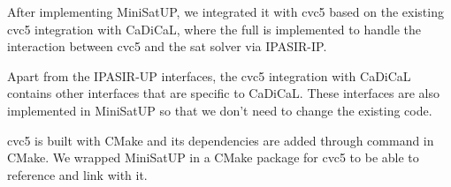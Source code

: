 
After implementing MiniSatUP, we integrated it with cvc5 based on the existing cvc5 integration with CaDiCaL, where the full  is implemented to handle the interaction between cvc5 and the sat solver via IPASIR-IP.



Apart from the IPASIR-UP interfaces, the cvc5 integration with CaDiCaL contains other interfaces that are specific to CaDiCaL. These interfaces are also implemented in MiniSatUP so that we don't need to change the existing code.



cvc5 is built with CMake and its dependencies are added through  command in CMake. We wrapped MiniSatUP in a CMake package for cvc5 to be able to reference and link with it.
